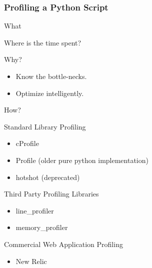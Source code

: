 \documentclass[c,english]{beamer}
\begin{document}
\begin{frame}[fragile]
\frametitle{Profiling a Python Script}


\begin{block}{ What }

Where is the time spent?

\end{block}

\pause

\begin{block}{ Why? }
\begin{itemize}

\item Know the bottle-necks.

\item Optimize intelligently.
\end{itemize}

\end{block}

\begin{block}{ How? }

Standard Library Profiling
\begin{itemize}

\item cProfile

\item Profile  (older pure python implementation)

\item hotshot  (deprecated)
\end{itemize}

Third Party Profiling Libraries
\begin{itemize}

\item line\_profiler

\item memory\_profiler
\end{itemize}

Commercial Web Application Profiling
\begin{itemize}

\item New Relic
\end{itemize}

\end{block}
\end{frame}
\end{document}
